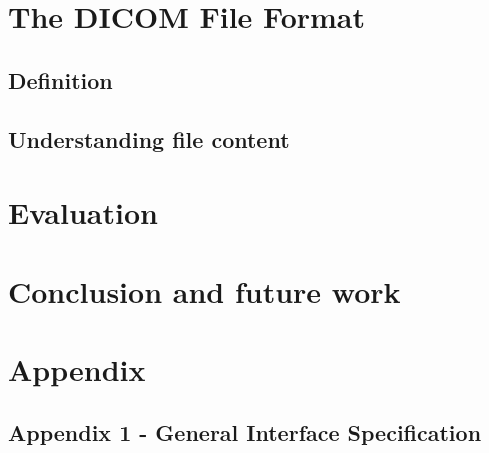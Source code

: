 \documentclass[12pt,twoside]{article}
\begin{document}
\clearpage
\section{The DICOM File Format}
\subsection{Definition}



\subsection{Understanding file content}

\cite{DICOMWEBSITE:1} 



\clearpage

\section{Evaluation}



\clearpage

\section{Conclusion and future work}



\clearpage
\section{Appendix}
\subsection {Appendix 1 - General Interface Specification}
\end{document}
